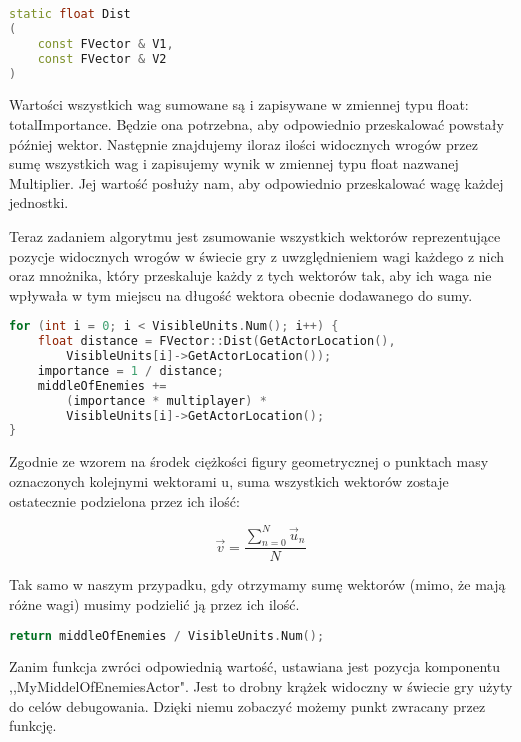 \documentclass[12pt]{report}
\begin{document}
\begin{lstlisting}[language=C++, backgroundcolor=\color{black!5}, basicstyle=\footnotesize, caption=Deklaracja funkcji Dist() w klasie FVector]
static float Dist
(
    const FVector & V1,
    const FVector & V2
)
\end{lstlisting}
Wartości wszystkich wag sumowane są i zapisywane w zmiennej typu float: totalImportance. Będzie ona potrzebna, aby odpowiednio przeskalować powstały później wektor. Następnie znajdujemy iloraz ilości widocznych wrogów przez sumę wszystkich wag i zapisujemy wynik w zmiennej typu float nazwanej Multiplier. Jej wartość posłuży nam, aby odpowiednio przeskalować wagę każdej jednostki.

Teraz zadaniem algorytmu jest zsumowanie wszystkich wektorów reprezentujące pozycje widocznych wrogów w świecie gry z uwzględnieniem wagi każdego z nich oraz mnożnika, który przeskaluje każdy z tych wektorów tak, aby ich waga nie wpływała w tym miejscu na długość wektora obecnie dodawanego do sumy.
\begin{lstlisting}[language=C++, backgroundcolor=\color{black!5}, basicstyle=\footnotesize, caption=Pętla sumująca wektory pozycji wrogów z uwzględnieniem ich wag]
for (int i = 0; i < VisibleUnits.Num(); i++) {
    float distance = FVector::Dist(GetActorLocation(), 
        VisibleUnits[i]->GetActorLocation());
	importance = 1 / distance;
	middleOfEnemies += 
	    (importance * multiplayer) *  
	    VisibleUnits[i]->GetActorLocation();
}
\end{lstlisting}

Zgodnie ze wzorem na środek ciężkości figury geometrycznej o punktach masy oznaczonych kolejnymi wektorami u, suma wszystkich wektorów zostaje ostatecznie podzielona przez ich ilość:

$$\vec v = \dfrac{\sum_{n=0}^{N}  \vec u_n}{N}   $$

Tak samo w naszym przypadku, gdy otrzymamy sumę wektorów (mimo, że mają różne wagi) musimy podzielić ją przez ich ilość.
\begin{lstlisting}[language=C++, backgroundcolor=\color{black!5}, basicstyle=\footnotesize, caption=Wartość zwracana funkcji GetMiddleOfEnemies();]
return middleOfEnemies / VisibleUnits.Num();
\end{lstlisting}

Zanim funkcja zwróci odpowiednią wartość, ustawiana jest pozycja komponentu ,,MyMiddelOfEnemiesActor". Jest to drobny krążek widoczny w świecie gry użyty do celów debugowania. Dzięki niemu zobaczyć możemy punkt zwracany przez funkcję.
\end{document}
